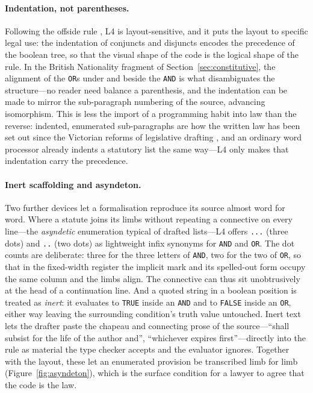 \documentclass[sigconf,nonacm]{acmart}
\newcommand{\code}[1]{\texttt{\small #1}}
\begin{document}
\paragraph{Indentation, not parentheses.}
Following the offside rule \cite{landin1966next700}, L4 is
layout-sensitive, and it puts the layout to specific legal use: the
indentation of conjuncts and disjuncts encodes the precedence of the
boolean tree, so that the visual shape of the code is the logical shape of
the rule. In the British Nationality fragment of
Section~\ref{sec:constitutive}, the alignment of the \code{OR}s under and
beside the \code{AND} is what disambiguates the structure---no reader need
balance a parenthesis, and the indentation can be made to mirror the
sub-paragraph numbering of the source, advancing isomorphism. This is less the
import of a programming habit into law than the reverse: indented, enumerated
sub-paragraphs are how the written law has been set out since the Victorian
reforms of legislative drafting \cite{coode1843}, and an ordinary word processor
already indents a statutory list the same way---L4 only makes that indentation
carry the precedence.

\paragraph{Inert scaffolding and asyndeton.}
Two further devices let a formalisation reproduce its source almost word for
word. Where a statute joins its limbs without repeating a connective on every
line---the \emph{asyndetic} enumeration typical of drafted lists---L4 offers
\code{...} (three dots) and \code{..} (two dots) as lightweight infix synonyms
for \code{AND} and \code{OR}. The dot counts are deliberate: three for the three
letters of \code{AND}, two for the two of \code{OR}, so that in the fixed-width
register the implicit mark and its spelled-out form occupy the same column and
the limbs align. The connective can thus sit unobtrusively at the head of a
continuation line. And a quoted string in a boolean position is treated as
\emph{inert}: it evaluates to \code{TRUE} inside an \code{AND} and to
\code{FALSE} inside an \code{OR}, either way leaving the surrounding condition's
truth value untouched. Inert text lets the drafter paste the chapeau and
connecting prose of the source---``shall subsist for the life of the author
and'', ``whichever expires first''---directly into the rule as material the type
checker accepts and the evaluator ignores. Together with the layout, these let an
enumerated provision be transcribed limb for limb (Figure~\ref{fig:asyndeton}),
which is the surface condition for a lawyer to agree that the code is the law.
\end{document}
